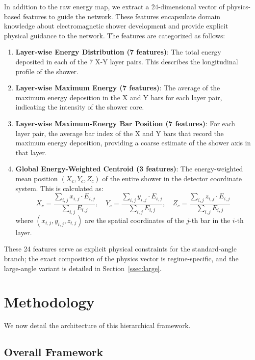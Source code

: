 \documentclass[preprint,12pt]{elsarticle}
\begin{document}
In addition to the raw energy map, we extract a 24-dimensional vector of physics-based features to guide the network. These features encapsulate domain knowledge about electromagnetic shower development and provide explicit physical guidance to the network. The features are categorized as follows:
\begin{enumerate}
    \item \textbf{Layer-wise Energy Distribution (7 features)}: The total energy deposited in each of the 7 X-Y layer pairs. This describes the longitudinal profile of the shower.
    \item \textbf{Layer-wise Maximum Energy (7 features)}: The average of the maximum energy deposition in the X and Y bars for each layer pair, indicating the intensity of the shower core. 
    \item \textbf{Layer-wise Maximum-Energy Bar Position (7 features)}: For each layer pair, the average bar index of the X and Y bars that record the maximum energy deposition, providing a coarse estimate of the shower axis in that layer.
    \item \textbf{Global Energy-Weighted Centroid (3 features)}: The energy-weighted mean position $(X_c, Y_c, Z_c)$ of the entire shower in the detector coordinate system. This is calculated as:
    \begin{equation}
    X_c = \frac{\sum_{i,j} x_{i,j} \cdot E_{i,j}}{\sum_{i,j} E_{i,j}}, \quad Y_c = \frac{\sum_{i,j} y_{i,j} \cdot E_{i,j}}{\sum_{i,j} E_{i,j}}, \quad Z_c = \frac{\sum_{i,j} z_{i,j} \cdot E_{i,j}}{\sum_{i,j} E_{i,j}}
    \end{equation}
    where $(x_{i,j}, y_{i,j}, z_{i,j})$ are the spatial coordinates of the $j$-th bar in the $i$-th layer.
\end{enumerate}
These 24 features serve as explicit physical constraints for the standard-angle branch; the exact composition of the physics vector is regime-specific, and the large-angle variant is detailed in Section~\ref{ssec:large}.


\FloatBarrier
\section{Methodology}
\label{sec:method}

We now detail the architecture of this hierarchical framework.

\subsection{Overall Framework}
\label{ssec:framework}
\end{document}

